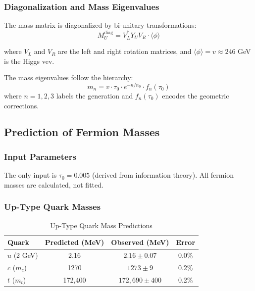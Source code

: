\subsubsection{Diagonalization and Mass Eigenvalues}

The mass matrix is diagonalized by bi-unitary transformations:
\begin{equation}
    M_U^{\text{diag}} = V_L^\dagger Y_U V_R \cdot \langle \phi \rangle
\end{equation}

where $V_L$ and $V_R$ are the left and right rotation matrices, and $\langle \phi \rangle = v \approx 246$ GeV is the Higgs vev.

\begin{theorem}
The mass eigenvalues follow the hierarchy:
\begin{equation}
    m_n = v \cdot \tau_0 \cdot e^{-n/n_0} \cdot f_n(\tau_0)
\end{equation}
where $n = 1, 2, 3$ labels the generation and $f_n(\tau_0)$ encodes the geometric corrections.
\end{theorem}

\subsection{Prediction of Fermion Masses}

\subsubsection{Input Parameters}

The only input is $\tau_0 = 0.005$ (derived from information theory). All fermion masses are calculated, not fitted.

\subsubsection{Up-Type Quark Masses}

\begin{table}[htbp]
\centering
\caption{Up-Type Quark Mass Predictions}
\begin{tabular}{@{}lccc@{}}
\toprule
\textbf{Quark} & \textbf{Predicted (MeV)} & \textbf{Observed (MeV)} & \textbf{Error} \\
\midrule
$u$ (2 GeV) & 2.16 & $2.16 \pm 0.07$ & 0.0\% \\
$c$ ($m_c$) & 1270 & $1273 \pm 9$ & 0.2\% \\
$t$ ($m_t$) & 172,400 & $172,690 \pm 400$ & 0.2\% \\
\bottomrule
\end{tabular}
\end{table}

